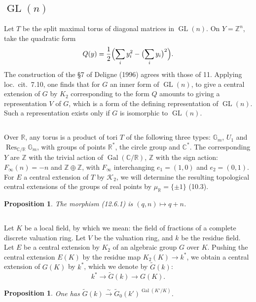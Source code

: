 \documentclass[11pt,a4paper]{article}
\theoremstyle{plain}
\newtheorem{proposition}[theorem]{Proposition}
\theoremstyle{definition}
\DeclareMathOperator{\Gal}{Gal}
\DeclareMathOperator{\Res}{Res}
\newcommand{\cK}{\mathcal{K}}
\newcommand{\bZ}{\mathbb{Z}}
\newcommand{\bR}{\mathbb{R}}
\newcommand{\bC}{\mathbb{C}}
\newcommand{\Gm}{{\mathbb{G}_m}}
\DeclareMathOperator{\GL}{GL}
\begin{document}
\subsection{$\GL(n)$}
Let $T$ be the split maximal torus of diagonal matrices in $\GL(n)$. On $Y = \bZ^n$, take the quadratic form
\[Q(y) = \frac{1}{2}\Bigl(\sum_i y_i^2 - \bigl(\sum_i y_i\bigr)^2\Bigr).\]
The construction of the \S 7 of Deligne (1996) agrees with those of 11. Applying loc.~cit.~7.10, one finds that for $G$ an inner form of $\GL(n)$, to give a central extension of $G$ by $K_2$ corresponding to the form $Q$ amounts to giving a representation $V$ of $G$, which is a form of the defining representation of $\GL(n)$. Such a representation exists only if $G$ is isomorphic to $\GL(n)$.

\subsection{}
Over $\bR$, any torus is a product of tori $T$ of the following three types: $\Gm$, $U_1$ and $\Res_{\bC/\bR}\Gm$, with groups of points $\bR^*$, the circle group and $\bC^*$. The corresponding $Y$ are $\bZ$ with the trivial action of $\Gal(\bC/\bR)$, $\bZ$ with the sign action: $F_\infty(n) = -n$ and $\bZ \oplus \bZ$, with $F_\infty$ interchanging $e_1 = (1,0)$ and $e_2 = (0,1)$. For $E$ a central extension of $T$ by $\cK_2$, we will determine the resulting topological central extensions of the groups of real points by $\mu_\bR = \{\pm 1\}$ (10.3).

\begin{proposition}\label{prop:12.7}
The morphism \textup{(12.6.1)} is $(q, n) \mapsto q + n$.
\end{proposition}

\subsection{}
Let $K$ be a local field, by which we mean: the field of fractions of a complete discrete valuation ring. Let $V$ be the valuation ring, and $k$ be the residue field. Let $E$ be a central extension by $K_2$ of an algebraic group $G$ over $K$. Pushing the central extension $E(K)$ by the residue map $K_2(K) \to k^*$, we obtain a central extension of $G(K)$ by $k^*$, which we denote by $\widetilde{G}(k)$:
\begin{equation}\label{eq:12.8.1}
k^* \to \widetilde{G}(k) \to G(K).
\end{equation}

\begin{proposition}\label{prop:12.9}
One has $\widetilde{G}(k) \xrightarrow{\sim} \widetilde{G}_0(k')^{\Gal(K'/K)}$.
\end{proposition}
\end{document}
